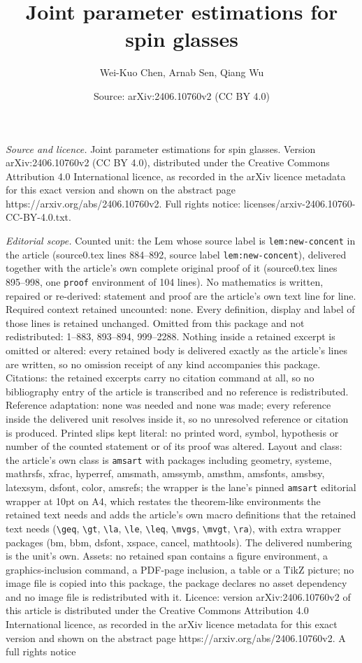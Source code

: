\documentclass[10pt,a4paper]{amsart}
\title[Joint parameter estimations for spin glasses]{Joint parameter estimations for spin glasses}
\author{Wei-Kuo Chen, Arnab Sen, Qiang Wu}
\date{Source: arXiv:2406.10760v2 (CC BY 4.0)}
\begin{document}
\maketitle

\noindent\emph{Source and licence.} Joint parameter estimations for spin glasses. Version arXiv:2406.10760v2 (CC BY 4.0), distributed under the Creative Commons Attribution 4.0 International licence, as recorded in the arXiv licence metadata for this exact version and shown on the abstract page https://arxiv.org/abs/2406.10760v2. Full rights notice: licenses/arxiv-2406.10760-CC-BY-4.0.txt.\par\smallskip

\noindent\textit{Editorial scope.} Counted unit: the Lem whose source label is \texttt{lem:new-concent} in the article (source0.tex lines 884--892, source label \texttt{lem:new-concent}), delivered together with the article's own complete original proof of it (source0.tex lines 895--998, one \texttt{proof} environment of 104 lines). No mathematics is written, repaired or re-derived: statement and proof are the article's own text line for line. Required context retained uncounted: none. Every definition, display and label of those lines is retained unchanged. Omitted from this package and not redistributed: 1--883, 893--894, 999--2288. Nothing inside a retained excerpt is omitted or altered: every retained body is delivered exactly as the article's lines are written, so no omission receipt of any kind accompanies this package. Citations: the retained excerpts carry no citation command at all, so no bibliography entry of the article is transcribed and no reference is redistributed. Reference adaptation: none was needed and none was made; every reference inside the delivered unit resolves inside it, so no unresolved reference or citation is produced. Printed slips kept literal: no printed word, symbol, hypothesis or number of the counted statement or of its proof was altered. Layout and class: the article's own class is \texttt{amsart} with packages including geometry, systeme, mathrsfs, xfrac, hyperref, amsmath, amssymb, amsthm, amsfonts, amsbsy, latexsym, dsfont, color, amsrefs; the wrapper is the lane's pinned \texttt{amsart} editorial wrapper at 10pt on A4, which restates the theorem-like environments the retained text needs and adds the article's own macro definitions that the retained text needs (\texttt{\textbackslash geq}, \texttt{\textbackslash gt}, \texttt{\textbackslash la}, \texttt{\textbackslash le}, \texttt{\textbackslash leq}, \texttt{\textbackslash mvgs}, \texttt{\textbackslash mvgt}, \texttt{\textbackslash ra}), with extra wrapper packages (bm, bbm, dsfont, xspace, cancel, mathtools). The delivered numbering is the unit's own. Assets: no retained span contains a figure environment, a graphics-inclusion command, a PDF-page inclusion, a table or a TikZ picture; no image file is copied into this package, the package declares no asset dependency and no image file is redistributed with it. Licence: version arXiv:2406.10760v2 of this article is distributed under the Creative Commons Attribution 4.0 International licence, as recorded in the arXiv licence metadata for this exact version and shown on the abstract page https://arxiv.org/abs/2406.10760v2. A full rights notice 
\end{document}

